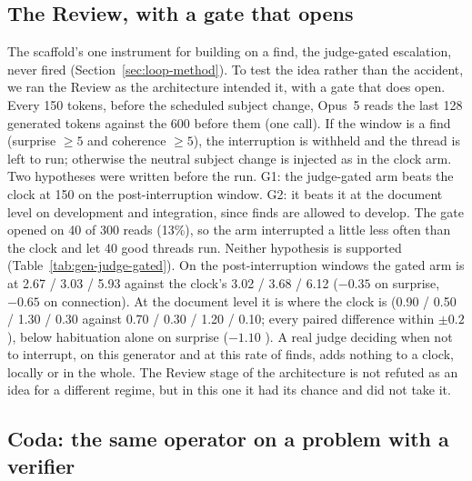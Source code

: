 \subsection{The Review, with a gate that opens}
\label{sec:gate}

The scaffold's one instrument for building on a find, the judge-gated
escalation, never fired (Section~\ref{sec:loop-method}). To test the idea
rather than the accident, we ran the Review as the architecture intended it,
with a gate that does open. Every 150 tokens, before the scheduled subject
change, Opus~5 reads the last 128 generated tokens against the 600 before
them (one call). If the window is a find (surprise $\ge5$ and coherence
$\ge5$), the interruption is withheld and the thread is left to run;
otherwise the neutral subject change is injected as in the clock arm. Two
hypotheses were written before the run. G1: the judge-gated arm beats the
clock at 150 on the post-interruption window. G2: it beats it at the
document level on development and integration, since finds are allowed to
develop. The gate opened on 40 of 300 reads (13\%), so the arm interrupted a
little less often than the clock and let 40 good threads run. Neither
hypothesis is supported (Table~\ref{tab:gen-judge-gated}). On the
post-interruption windows the gated arm is at 2.67 / 3.03 / 5.93 against the
clock's 3.02 / 3.68 / 6.12 ($-0.35$  on surprise, $-0.65$
 on connection). At the document level it is where the
clock is (0.90 / 0.50 / 1.30 / 0.30 against 0.70 / 0.30 / 1.20 / 0.10; every
paired difference within $\pm0.2$), below habituation alone on surprise
($-1.10$ ). A real judge deciding when not to interrupt,
on this generator and at this rate of finds, adds nothing to a clock,
locally or in the whole. The Review stage of the architecture is not refuted
as an idea for a different regime, but in this one it had its chance and
did not take it.

\subsection{Coda: the same operator on a problem with a verifier}
\label{sec:problem}

